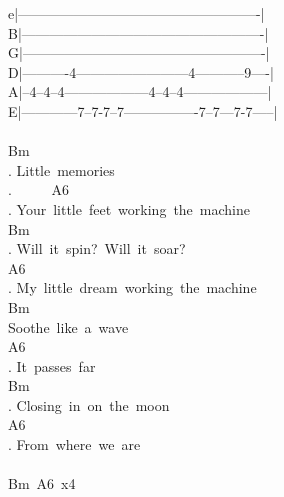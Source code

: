 {e|----------------------------------------------------|\\
B|----------------------------------------------------|\\
G|----------------------------------------------------|\\
D|----------4------------------------4-----------9----|\\
A|--4--4--4------------------4--4--4------------------|\\
E|------------7--7-7--7----------------7--7---7-7-----|\\
\\
Bm\\
. Little\ memories\\
. \ \ \ \ \ A6\\
. Your\ little\ feet\ working\ the\ machine\\
Bm\\
. Will\ it\ spin?\ Will\ it\ soar?\\
A6\\
. My\ little\ dream\ working\ the\ machine\\
Bm\\
Soothe\ like\ a\ wave\\
A6\\
. It\ passes\ far\\
Bm\\
. Closing\ in\ on\ the\ moon\\
A6\\
. From\ where\ we\ are\\
\\
Bm\ A6\ x4\ }
